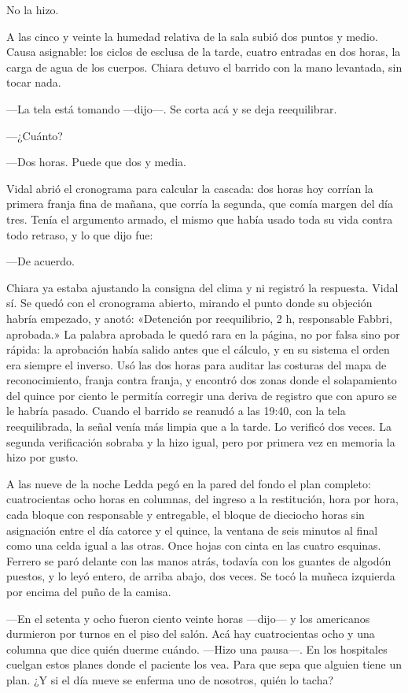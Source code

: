 No la hizo.

A las cinco y veinte la humedad relativa de la sala subió dos puntos y medio. Causa asignable: los ciclos de esclusa de la tarde, cuatro entradas en dos horas, la carga de agua de los cuerpos. Chiara detuvo el barrido con la mano levantada, sin tocar nada.

---La tela está tomando ---dijo---. Se corta acá y se deja reequilibrar.

---¿Cuánto?

---Dos horas. Puede que dos y media.

Vidal abrió el cronograma para calcular la cascada: dos horas hoy corrían la primera franja fina de mañana, que corría la segunda, que comía margen del día tres. Tenía el argumento armado, el mismo que había usado toda su vida contra todo retraso, y lo que dijo fue:

---De acuerdo.

Chiara ya estaba ajustando la consigna del clima y ni registró la respuesta. Vidal sí. Se quedó con el cronograma abierto, mirando el punto donde su objeción habría empezado, y anotó: «Detención por reequilibrio, 2 h, responsable Fabbri, aprobada.» La palabra aprobada le quedó rara en la página, no por falsa sino por rápida: la aprobación había salido antes que el cálculo, y en su sistema el orden era siempre el inverso. Usó las dos horas para auditar las costuras del mapa de reconocimiento, franja contra franja, y encontró dos zonas donde el solapamiento del quince por ciento le permitía corregir una deriva de registro que con apuro se le habría pasado. Cuando el barrido se reanudó a las 19:40, con la tela reequilibrada, la señal venía más limpia que a la tarde. Lo verificó dos veces. La segunda verificación sobraba y la hizo igual, pero por primera vez en memoria la hizo por gusto.

A las nueve de la noche Ledda pegó en la pared del fondo el plan completo: cuatrocientas ocho horas en columnas, del ingreso a la restitución, hora por hora, cada bloque con responsable y entregable, el bloque de dieciocho horas sin asignación entre el día catorce y el quince, la ventana de seis minutos al final como una celda igual a las otras. Once hojas con cinta en las cuatro esquinas. Ferrero se paró delante con las manos atrás, todavía con los guantes de algodón puestos, y lo leyó entero, de arriba abajo, dos veces. Se tocó la muñeca izquierda por encima del puño de la camisa.

---En el setenta y ocho fueron ciento veinte horas ---dijo--- y los americanos durmieron por turnos en el piso del salón. Acá hay cuatrocientas ocho y una columna que dice quién duerme cuándo. ---Hizo una pausa---. En los hospitales cuelgan estos planes donde el paciente los vea. Para que sepa que alguien tiene un plan. ¿Y si el día nueve se enferma uno de nosotros, quién lo tacha?

